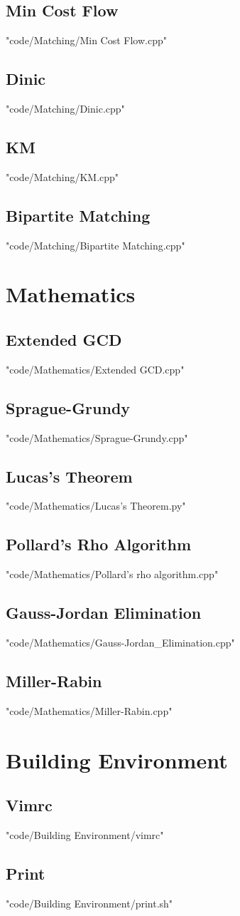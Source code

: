 \documentclass [landscape,8pt,a4paper,twocolumn]{article}
\begin{document}
\subsection{Min Cost Flow}
 {"code/Matching/Min Cost Flow.cpp"}
\subsection{Dinic}
 {"code/Matching/Dinic.cpp"}
\subsection{KM}
 {"code/Matching/KM.cpp"}
\subsection{Bipartite Matching}
 {"code/Matching/Bipartite Matching.cpp"}
\section{Mathematics}
\subsection{Extended GCD}
 {"code/Mathematics/Extended GCD.cpp"}
\subsection{Sprague-Grundy}
 {"code/Mathematics/Sprague-Grundy.cpp"}
\subsection{Lucas's Theorem}
 {"code/Mathematics/Lucas's Theorem.py"}
\subsection{Pollard's Rho Algorithm}
 {"code/Mathematics/Pollard's rho algorithm.cpp"}
\subsection{Gauss-Jordan Elimination}
 {"code/Mathematics/Gauss-Jordan_Elimination.cpp"}
\subsection{Miller-Rabin}
 {"code/Mathematics/Miller-Rabin.cpp"}
\section{Building Environment}
\subsection{Vimrc}
 {"code/Building Environment/vimrc"}
\subsection{Print}
 {"code/Building Environment/print.sh"}


\end{document}
